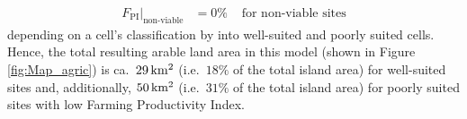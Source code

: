 \begin{itemize}
\begin{eqnarray*}
		F_\text{PI}|_\text{non-viable} & = 0\% & \text{ for non-viable sites}
	\end{eqnarray*}
	depending on a cell's classification by \citet{Puleston2017} into well-suited and poorly suited cells.
	Hence, the total resulting arable land area in this model (shown in Figure \ref{fig:Map_agric}) is ca.\ $29\,  {\rm km^2}$ (i.e.\ $18\%$ of the total island area) for well-suited sites and, additionally, $50\, {\rm km^2}$ (i.e.\ $31\%$ of the total island area) for poorly suited sites with low Farming Productivity Index.
\end{itemize}

